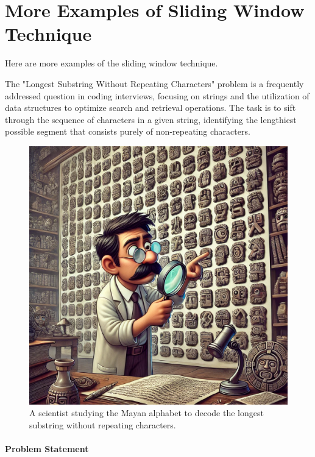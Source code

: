 \newpage
\section{More Examples of Sliding Window Technique}
Here are more examples of the sliding window technique.

\label{subsec:Longest_Substring_Without_Repeating_Characters}

The "Longest Substring Without Repeating Characters" problem is a frequently addressed question in coding interviews, focusing on strings and the utilization of data structures to optimize search and retrieval operations. The task is to sift through the sequence of characters in a given string, identifying the lengthiest possible segment that consists purely of non-repeating characters.

\begin{figure}[h]
  \centering
  \includegraphics[width=\mywidth]{figs/mayan.png}  
  \caption{A scientist studying the Mayan alphabet to decode the longest substring without repeating characters.}
  \label{fig:mayan}
\end{figure}

\paragraph*{Problem Statement}

